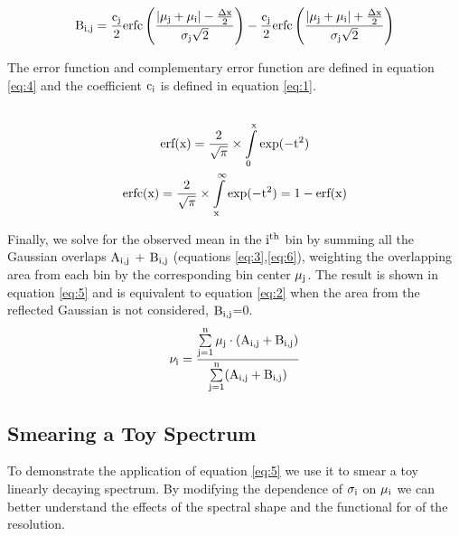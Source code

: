 \begin{equation}
\rm B_{i,j}=
\rm \frac{c_j}{2} erfc\left(\frac{|\mu_j+\mu_i| - \frac{\Delta x}{2}}{\sigma _j\sqrt{2}} \right) - 
\rm \frac{c_j}{2} erfc\left(\frac{|\mu_j+\mu_i| + \frac{\Delta x}{2}}{\sigma _j\sqrt{2}} \right)
\label{eq:6}
\end{equation}

The error function and complementary error function are defined in equation \ref{eq:4} and the coefficient $\rm c_i$ is defined in equation \ref{eq:1}.
\begin{multline}
\\ \rm erf(x)=\frac{2}{\sqrt{\pi}} \times \int\limits_{0}^{x} exp(-t^2)\\
\rm erfc(x)=\frac{2}{\sqrt{\pi}} \times \int\limits_{x}^{\infty} exp(-t^2) = 1 - erf(x)\\
\label{eq:4}
\end{multline}

Finally, we solve for the observed mean in the $\rm i^{th}$ bin by summing all the Gaussian overlaps $\rm A_{i,j}$ + $\rm B_{i,j}$ (equations \ref{eq:3},\ref{eq:6}), weighting the overlapping area from each bin by the corresponding bin center $\rm \mu_j$. The result is shown in equation \ref{eq:5} and is equivalent to equation \ref{eq:2} when the area from the reflected Gaussian is not considered, $\rm B_{i,j}$=0.
\begin{equation}
\rm \nu_i =  \frac{\sum\limits_{j=1}^{n}\mu_j\cdot (A_{i,j}+B_{i,j})}{\sum\limits_{j=1}^{n} (A_{i,j}+B_{i,j})}
\label{eq:5}
\end{equation}

\subsection{Smearing a Toy Spectrum}

To demonstrate the application of equation \ref{eq:5} we use it to smear a toy linearly decaying spectrum. By modifying the dependence of $\rm \sigma_i$ on $\rm \mu_i$ we can better understand the effects of the spectral shape and the functional for of the resolution.

